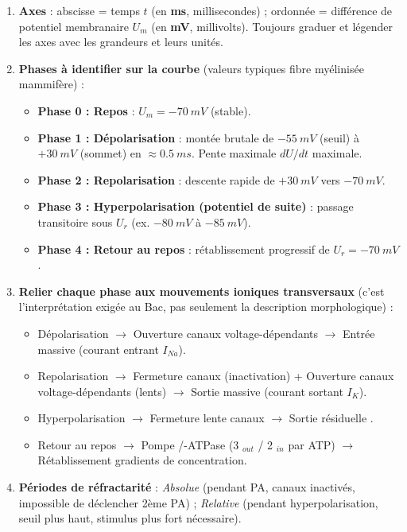 \documentclass[11pt]{article}
\begin{document}
\begin{methode}
\begin{enumerate}
\item \textbf{Axes} : abscisse = temps $t$ (en \textbf{ms}, millisecondes) ; ordonnée = différence de potentiel membranaire $U_m$ (en \textbf{mV}, millivolts). Toujours graduer et légender les axes avec les grandeurs et leurs unités.
\item \textbf{Phases à identifier sur la courbe} (valeurs typiques fibre myélinisée mammifère) :
\begin{itemize}
\item \textbf{Phase 0 : Repos} : $U_m = -\SI{70}{mV}$ (stable).
\item \textbf{Phase 1 : Dépolarisation} : montée brutale de $-\SI{55}{mV}$ (seuil) à $+\SI{30}{mV}$ (sommet) en $\approx \SI{0,5}{ms}$. Pente maximale $dU/dt$ maximale.
\item \textbf{Phase 2 : Repolarisation} : descente rapide de $+\SI{30}{mV}$ vers $-\SI{70}{mV}$.
\item \textbf{Phase 3 : Hyperpolarisation (potentiel de suite)} : passage transitoire sous $U_r$ (ex. $-\SI{80}{mV}$ à $-\SI{85}{mV}$).
\item \textbf{Phase 4 : Retour au repos} : rétablissement progressif de $U_r = -\SI{70}{mV}$.
\end{itemize}
\item \textbf{Relier chaque phase aux mouvements ioniques transversaux} (c'est l'interprétation exigée au Bac, pas seulement la description morphologique) :
\begin{itemize}
\item Dépolarisation $\rightarrow$ Ouverture canaux  voltage-dépendants $\rightarrow$ Entrée massive  (courant entrant $I_{Na}$).
\item Repolarisation $\rightarrow$ Fermeture canaux  (inactivation) + Ouverture canaux  voltage-dépendants (lents) $\rightarrow$ Sortie massive  (courant sortant $I_K$).
\item Hyperpolarisation $\rightarrow$ Fermeture lente canaux  $\rightarrow$ Sortie résiduelle .
\item Retour au repos $\rightarrow$ Pompe /-ATPase (3 $_{out}$ / 2 $_{in}$ par ATP) $\rightarrow$ Rétablissement gradients de concentration.
\end{itemize}
\item \textbf{Périodes de réfractarité} : \emph{Absolue} (pendant PA, canaux  inactivés, impossible de déclencher 2ème PA) ; \emph{Relative} (pendant hyperpolarisation, seuil plus haut, stimulus plus fort nécessaire).
\end{enumerate}
\end{methode}
\end{document}
